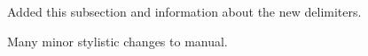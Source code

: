 \documentclass{amsart}
\begin{document}
Added this subsection and information about the new delimiters.

Many minor stylistic changes to manual.
 \begin{comment}%
 reverse parens
 \begin{align*}
  \nrp{
 \nrpb{
 \nrpbb{
 \nrpbbb{
 \nrpbbbb{w}}}}}
 \rpqs{
 \rpqsb{
 \rpqsbb{
 \rpqsbbb{
 \rpqsbbbb{z}}}}}
%
\end{align*}
 
 stgt's
 \begin{align*}
& 
\rstgt
\rstgtbb 
\rstgtbbb
\rstgtbbbb 
\Brstgt
\Brstgtb
\Brstgtbb
\Brstgtbbb
\Brstgtbbbb\\
& \stgt{\stgtb{\stgtbb{\stgtbbb{\stgtbbbb{w}}}}}\\
&\Bstgt{\Bstgtb{\Bstgtbb{\Bstgtbbb{\Bstgtbbbb{w}}}}}\\
&
\lstgt
\lstgtb
\lstgtbb
\lstgtbbb
\lstgtbbbb
\Blstgt
\Blstgtb
\Blstgtbb
\Blstgtbbb
\Blstgtbbbb
 \end{align*}
 

\end{comment}
\end{document}
